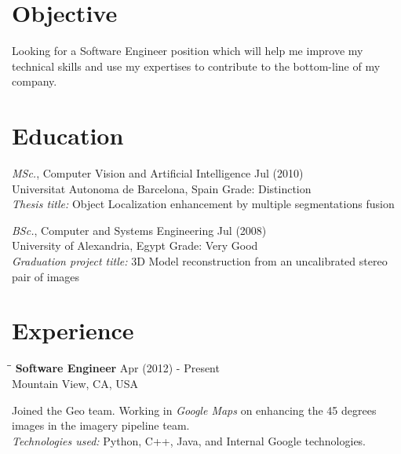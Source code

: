 \documentclass{res}
\begin{document}
\pagestyle{empty}
\renewcommand{\headrulewidth}{0.0pt}
\pagestyle{fancy}
\lhead{}
\chead{}
\rhead{}
\lfoot{}
\cfoot{}
\address{1600 Amphitheater pkwy \\ Mountain View, CA 94043 \\ +1 (425) 351-8760 \\ amounir@google.com}

\begin{resume}

\section{Objective}

Looking for a Software Engineer position which will help me improve my technical skills and use my expertises to contribute to
the bottom-line of my company.
 
\section{Education}

    {\sl MSc.}, Computer Vision and Artificial Intelligence \hfill Jul (2010) \\
    Universitat Autonoma de Barcelona, Spain \hspace{0.2in}  Grade: Distinction \\
    {\sl Thesis title:} Object Localization enhancement by multiple segmentations fusion

    {\sl BSc.}, Computer and Systems Engineering \hfill Jul (2008) \\
    University of Alexandria, Egypt \hspace{0.2in}  Grade: Very Good \\
    {\sl Graduation project title:} 3D Model reconstruction from an uncalibrated stereo pair of images
 
\section{Experience}
   \vspace{-0.1in}
   \begin{tabbing}
   \hspace{2.3in}\= \hspace{2.3in}\= \kill %
    {\bf Software Engineer}\> \hfill Apr (2012) - Present\\
                                    \>Mountain View, CA, USA
   \end{tabbing}\vspace{-20pt}      %
    Joined the Geo team. Working in {\sl Google Maps} on enhancing the 45 degrees images in the imagery pipeline team.\\
    {\sl Technologies used:} Python, C++, Java, and Internal Google technologies.


\end{resume}
\end{document}
